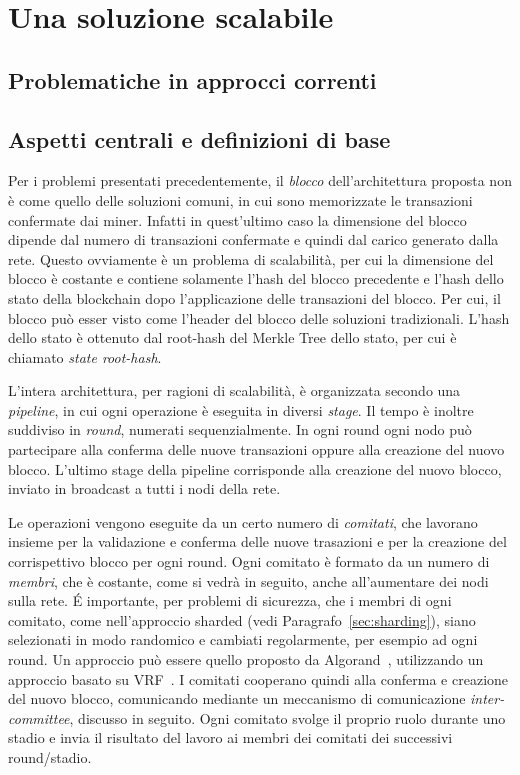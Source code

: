 \chapter{Una soluzione scalabile}

\section{Problematiche in approcci correnti}

\section{Aspetti centrali e definizioni di base}


Per i problemi presentati precedentemente, il \textit{blocco} dell'architettura proposta non è come quello delle soluzioni comuni, in cui sono memorizzate le transazioni confermate dai miner. Infatti in quest'ultimo caso la dimensione del blocco dipende dal numero di transazioni confermate e quindi dal carico generato dalla rete. Questo ovviamente è un problema di scalabilità, per cui la dimensione del blocco è costante e contiene solamente l'hash del blocco precedente e l'hash dello stato della blockchain dopo l'applicazione delle transazioni del blocco. Per cui, il blocco può esser visto come l'header del blocco delle soluzioni tradizionali. L'hash dello stato è ottenuto dal root-hash del Merkle Tree dello stato, per cui è chiamato \emph{state root-hash}.

L'intera architettura, per ragioni di scalabilità, è organizzata secondo una \emph{pipeline}, in cui ogni operazione è eseguita in diversi \emph{stage}. Il tempo è inoltre suddiviso in \emph{round}, numerati sequenzialmente. In ogni round ogni nodo può partecipare alla conferma delle nuove transazioni oppure alla creazione del nuovo blocco. L'ultimo stage della pipeline corrisponde alla creazione del nuovo blocco, inviato in broadcast a tutti i nodi della rete.

Le operazioni vengono eseguite da un certo numero di \emph{comitati}, che lavorano insieme per la validazione e conferma delle nuove trasazioni e per la creazione del corrispettivo blocco per ogni round. Ogni comitato è formato da un numero di \emph{membri}, che è costante, come si vedrà in seguito, anche all'aumentare dei nodi sulla rete. \'E importante, per problemi di sicurezza, che i membri di ogni comitato, come nell'approccio sharded (vedi Paragrafo~\ref{sec:sharding}), siano selezionati in modo randomico e cambiati regolarmente, per esempio ad ogni round. Un approccio può essere quello proposto da Algorand~\cite{gilad2017algorand}, utilizzando un approccio basato su VRF~\cite{micali1999verifiable}. I comitati cooperano quindi alla conferma e creazione del nuovo blocco, comunicando mediante un meccanismo di comunicazione \emph{inter-committee}, discusso in seguito.
Ogni comitato svolge il proprio ruolo durante uno stadio e invia il risultato del lavoro ai membri dei comitati dei successivi round/stadio.

